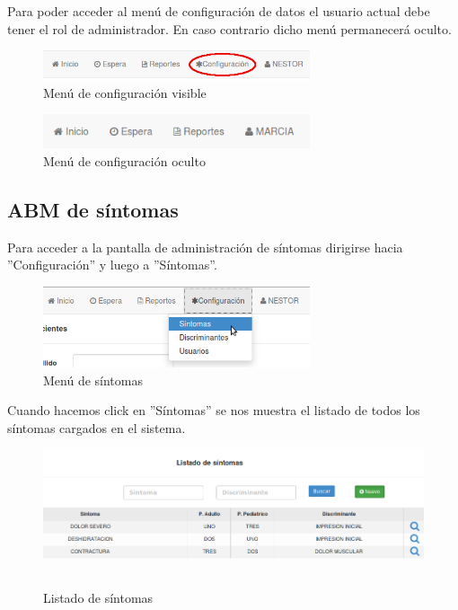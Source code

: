 
Para poder acceder al menú de configuración de datos el usuario actual debe tener el rol de administrador. En caso contrario dicho menú permanecerá oculto.

\begin{figure}[h]
\centerline{\includegraphics[width=0.7\textwidth]{menu_configuracion_visible.png}}
\caption{Menú de configuración visible}
\end{figure}

\begin{figure}[h]
\centerline{\includegraphics[width=0.7\textwidth]{menu_configuracion_oculto.png}}
\caption{Menú de configuración oculto}
\end{figure}

\subsection{ABM de síntomas}
Para acceder a la pantalla de administración de síntomas dirigirse hacia ''Configuración'' y luego a ''Síntomas''.

\begin{figure}[h]
\centerline{\includegraphics[width=0.7\textwidth]{menu_sintomas.png}}
\caption{Menú de síntomas}
\end{figure}

Cuando hacemos click en ''Síntomas'' se nos muestra el listado de todos los síntomas cargados en el sistema.

\begin{figure}[h]
\centerline{\includegraphics[width=1\textwidth]{sintomas_listado.png}}
\caption{Listado de síntomas}
\end{figure}

